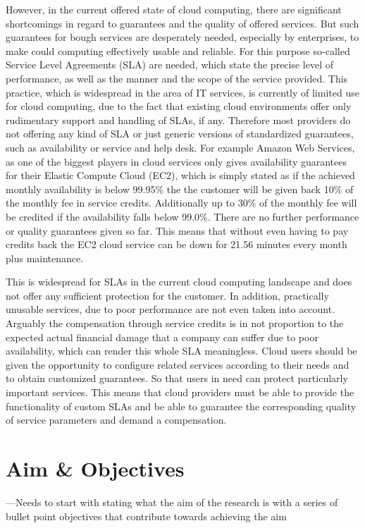 However, in the current offered state of cloud computing, there are significant shortcomings in regard to guarantees and the quality of offered services. But such guarantees for bough services are desperately needed, especially by enterprises, to make could computing  effectively usable\cite{DMTF2010} and reliable\cite{JTC}. 
For this purpose so-called Service Level Agreements (SLA) are needed, which state the precise level of performance, as well as the manner and the scope of the service provided. This practice, which is widespread in the area of IT services, is currently of limited use for cloud computing, due to the fact that existing cloud environments offer only rudimentary support and handling of SLAs, if any. Therefore most providers do not offering any kind of SLA or just generic versions of standardized guarantees, such as availability or service and help desk. For example Amazon Web Services\cite{AWS}, as one of the biggest players in cloud services only gives availability guarantees for their Elastic Compute Cloud (EC2)\cite{EC2SLA}, which is simply stated as if the achieved monthly availability is below 99.95\% the the customer will be given back 10\% of the monthly fee in service credits. Additionally up to 30\% of the monthly fee will be credited if the availability falls below 99.0\%. There are no further performance or quality guarantees given so far. This means that without even having to pay credits back the EC2 cloud service can be down for 21.56 minutes every month plus maintenance. 

This is widespread for SLAs in the current cloud computing landscape\cite{CloudSLAwhite} \cite{Baset:2012:CSP:2331576.2331586} and does not offer any sufficient protection for the customer. In addition, practically unusable services, due to poor performance are not even taken into account. Arguably the compensation  through service credits is in not proportion to the expected actual financial damage that a company can suffer due to poor availability, which can render this whole SLA meaningless\cite{meaning}. Cloud users should be given the opportunity to configure related services according to their needs and to obtain customized guarantees. So that users in need can protect particularly important services. This means that cloud providers must be able to provide the functionality of custom SLAs and be able to guarantee the corresponding quality of service parameters and demand a compensation. 


\section{Aim \& Objectives}
---Needs to start with stating what the aim of the research is with a series of bullet point objectives that contribute towards achieving the aim 


